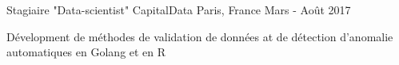 \begin{cventries}
    {Stagiaire "Data-scientist"} %
    {CapitalData} %
    {Paris, France} %
    {Mars - Août 2017} %
    {
      \begin{cvitems} %
        \item {Dévelopment de méthodes de validation de données at de détection d'anomalie automatiques en Golang et en R}
      \end{cvitems}
    }

\end{cventries}
